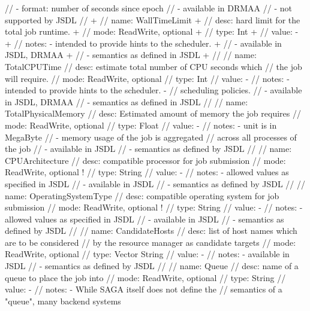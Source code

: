 \begin{myspec}
{{      //          - format: number of seconds since epoch
      //          - available in DRMAA
      //          - not supported by JSDL
      // 
+     //   name:  WallTimeLimit
+     //   desc:  hard limit for the total job runtime.
+     //   mode:  ReadWrite, optional
+     //   type:  Int
+     //   value: -
+     //   notes: - intended to provide hints to the scheduler. 
+     //          - available in JSDL, DRMAA
+     //          - semantics as defined in JSDL
+     // 
      //   name:  TotalCPUTime
      //   desc:  estimate total number of CPU seconds which
      //          the job will require. 
      //   mode:  ReadWrite, optional
      //   type:  Int
      //   value: -
      //   notes: - intended to provide hints to the scheduler. 
-     //            scheduling policies.
      //          - available in JSDL, DRMAA
      //          - semantics as defined in JSDL
      // 
      //   name:  TotalPhysicalMemory
      //   desc:  Estimated amount of memory the job requires
      //   mode:  ReadWrite, optional
      //   type:  Float
      //   value: -
      //   notes: - unit is in MegaByte
      //          - memory usage of the job is aggregated 
      //            across all processes of the job
      //          - available in JSDL
      //          - semantics as defined by JSDL
      // 
      //   name:  CPUArchitecture
      //   desc:  compatible processor for job submission
      //   mode:  ReadWrite, optional
!     //   type:  String
      //   value: -
      //   notes: - allowed values as specified in JSDL
      //          - available in JSDL
      //          - semantics as defined by JSDL
      // 
      //   name:  OperatingSystemType
      //   desc:  compatible operating system for job submission
      //   mode:  ReadWrite, optional
!     //   type:  String
      //   value: -
      //   notes: - allowed values as specified in JSDL
      //          - available in JSDL
      //          - semantics as defined by JSDL
      // 
      //   name:  CandidateHosts
      //   desc:  list of host names which are to be considered
      //          by the resource manager as candidate targets
      //   mode:  ReadWrite, optional
      //   type:  Vector String
      //   value: -
      //   notes: - available in JSDL
      //          - semantics as defined by JSDL
      //
      //   name:  Queue
      //   desc:  name of a queue to place the job into
      //   mode:  ReadWrite, optional
      //   type:  String
      //   value: -
      //   notes: - While SAGA itself does not define the 
      //            semantics of a "queue", many backend systems
}}
\end{myspec}
